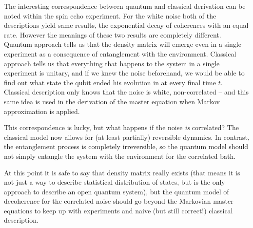 \documentclass[12pt]{report}
\numberwithin{equation}{section}
\begin{document}
The interesting correspondence between quantum and classical derivation can be noted within the spin echo experiment. For the white noise both of the descriptions yield same results, the exponential decay of coherences with an equal rate. However the meanings of these two results are completely different. Quantum approach tells us that the density matrix will emerge even in a single experiment as a consequence of entanglement with the environment. Classical approach tells us that everything that  happens to the system in a single experiment is unitary, and if we knew the noise beforehand, we would be able to find out what state the qubit ended his evolution in at every final time $t$. Classical description only knows that the noise is white, non-correlated -- and this same idea is used in the derivation of the master equation when Markov approximation is applied.

This correspondence is lucky, but what happens if the noise \textit{is} correlated? The classical model now allows for (at least partially) reversible dynamics. In contrast, the entanglement process is completely irreversible, so the quantum model should not simply entangle the system with the environment for the correlated bath.

At this point it is safe to say that density matrix really exists (that means it is not just a way to describe statistical distribution of states, but is the only approach to describe an open quantum system), but the quantum model of decoherence for the correlated noise should go beyond the Markovian master equations to keep up with experiments and naive (but still correct!) classical description.\cite{Zurek2003}
\end{document}
